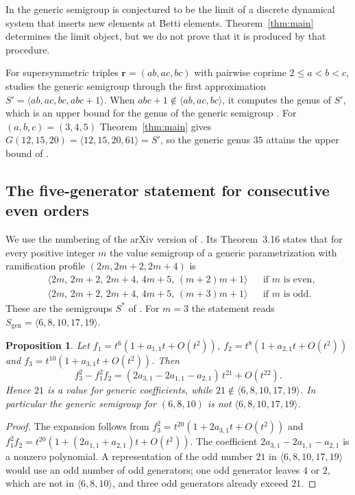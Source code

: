 \documentclass{amsart}
\newtheorem{proposition}[theorem]{Proposition}
\theoremstyle{definition}
\numberwithin{equation}{section}
\newcommand{\bfr}{\mathbf{r}}
\newcommand{\gen}[1]{\langle #1\rangle}
\begin{document}
In \cite[Remark~2.8]{CKV} the generic semigroup is conjectured to be the limit
of a discrete dynamical system that inserts new elements at Betti elements.
Theorem~\ref{thm:main} determines the limit object, but we do not prove that it
is produced by that procedure.

For supersymmetric triples $\bfr=(ab,ac,bc)$ with pairwise coprime
\mbox{$2\le a<b<c$}, \cite[Section~3]{CKV} studies the generic semigroup through the
first approximation $S'=\gen{ab,ac,bc,abc+1}$. When
$abc+1\notin\gen{ab,ac,bc}$, it computes the genus of $S'$, which is an upper
bound for the genus of the generic semigroup \cite[Proposition~3.12]{CKV}. For
$(a,b,c)=(3,4,5)$ Theorem~\ref{thm:main} gives
$G(12,15,20)=\gen{12,15,20,61}=S'$, so the generic genus $35$ attains the upper
bound of \cite[Proposition~3.12]{CKV}.

\subsection{The five-generator statement for consecutive even orders}\label{sec:CLM}
We use the numbering of the arXiv version of \cite{CLM}. Its Theorem~3.16
states that for every positive integer $m$ the value semigroup of a generic
parametrization with ramification profile $(2m,2m+2,2m+4)$ is
\begin{align*}
  &\gen{2m,\,2m+2,\,2m+4,\,4m+5,\,(m+2)m+1} && \text{if $m$ is even},\\
  &\gen{2m,\,2m+2,\,2m+4,\,4m+5,\,(m+3)m+1} && \text{if $m$ is odd}.
\end{align*}
These are the semigroups $S^*$
of \cite[Theorem~2.9]{CKV}. For $m=3$ the statement reads
$S_{\mathrm{gen}}=\gen{6,8,10,17,19}$.

\begin{proposition}\label{prop:CLM}
Let $f_1=t^6(1+a_{1,1}t+O(t^2))$, $f_2=t^8(1+a_{2,1}t+O(t^2))$ and
$f_3=t^{10}(1+a_{3,1}t+O(t^2))$. Then
\[
  f_3^2-f_1^2f_2=(2a_{3,1}-2a_{1,1}-a_{2,1})\,t^{21}+O(t^{22}).
\]
Hence $21$ is a value for generic coefficients, while
$21\notin\gen{6,8,10,17,19}$. In particular the generic semigroup for
$(6,8,10)$ is not $\gen{6,8,10,17,19}$.
\end{proposition}

\begin{proof}
The expansion follows from $f_3^2=t^{20}(1+2a_{3,1}t+O(t^2))$ and
$f_1^2f_2=t^{20}(1+(2a_{1,1}+a_{2,1})t+O(t^2))$. The coefficient
$2a_{3,1}-2a_{1,1}-a_{2,1}$ is a nonzero polynomial. A representation of the odd number $21$ in
$\gen{6,8,10,17,19}$ would use an odd number of odd generators; one odd
generator leaves $4$ or $2$, which are not in $\gen{6,8,10}$, and three odd
generators already exceed $21$.
\end{proof}
\end{document}
